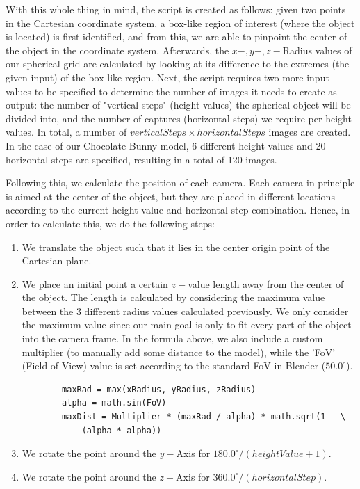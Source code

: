 With this whole thing in mind, the script is created as follows: given two points in the Cartesian coordinate system, a box-like region of interest (where the object is located) is first identified, and from this, we are able to pinpoint the center of the object in the coordinate system. Afterwards, the \(x-, y-, z-\)Radius values of our spherical grid are calculated by looking at its difference to the extremes (the given input) of the box-like region. Next, the script requires two more input values to be specified to determine the number of images it needs to create as output: the number of "vertical steps" (height values) the spherical object will be divided into, and the number of captures (horizontal steps) we require per height values. In total, a number of \(vertical Steps \times horizontal Steps\) images are created. In the case of our Chocolate Bunny model, 6 different height values and 20 horizontal steps are specified, resulting in a total of 120 images.

Following this, we calculate the position of each camera. Each camera in principle is aimed at the center of the object, but they are placed in different locations according to the current height value and horizontal step combination. Hence, in order to calculate this, we do the following steps:
\begin{enumerate}
    \item We translate the object such that it lies in the center origin point of the Cartesian plane.
    \item We place an initial point a certain \(z-\)value length away from the center of the object. The length is calculated by considering the maximum value between the 3 different radius values calculated previously. We only consider the maximum value since our main goal is only to fit every part of the object into the camera frame. In the formula above, we also include a custom multiplier (to manually add some distance to the model), while the 'FoV' (Field of View) value is set according to the standard FoV in Blender (\(50.0^\circ\)).

    \begin{verbatim}
        maxRad = max(xRadius, yRadius, zRadius)
        alpha = math.sin(FoV)
        maxDist = Multiplier * (maxRad / alpha) * math.sqrt(1 - \
            (alpha * alpha))
    \end{verbatim}
    
    \item We rotate the point around the \(y-\)Axis for \(180.0^\circ/(heightValue + 1)\).
    \item We rotate the point around the \(z-\)Axis for \(360.0^\circ/(horizontalStep)\).
\end{enumerate}

